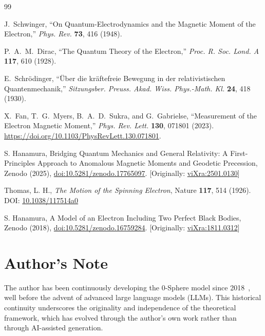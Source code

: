 \documentclass[%
 reprint,
 amsmath,amssymb,
 aps,
]{revtex4-1}
\numberwithin{equation}{section}
\begin{document}
\clearpage

\begin{thebibliography}{99}

J.~Schwinger,
``On Quantum-Electrodynamics and the Magnetic Moment of the Electron,''
\textit{Phys. Rev.} \textbf{73}, 416 (1948).

P.~A.~M.~Dirac,
``The Quantum Theory of the Electron,''
\textit{Proc. R. Soc. Lond. A} \textbf{117}, 610 (1928).

E.~Schr\"odinger,
``\"Uber die kr\"aftefreie Bewegung in der relativistischen Quantenmechanik,''
\textit{Sitzungsber. Preuss. Akad. Wiss. Phys.-Math. Kl.} \textbf{24}, 418 (1930).

X.~Fan, T.~G.~Myers, B.~A.~D.~Sukra, and G.~Gabrielse, 
``Measurement of the Electron Magnetic Moment,'' 
\textit{Phys. Rev. Lett.} \textbf{130}, 071801 (2023). 
\href{https://doi.org/10.1103/PhysRevLett.130.071801}{https://doi.org/10.1103/PhysRevLett.130.071801}.

S. Hanamura, Bridging Quantum Mechanics and General Relativity: A First-Principles Approach to Anomalous Magnetic Moments and Geodetic Precession, Zenodo (2025), \href{https://doi.org/10.5281/zenodo.17765097}{doi:10.5281/zenodo.17765097}. [Originally: \href{https://vixra.org/abs/2501.0130}{viXra:2501.0130}]

Thomas, L. H., 
\textit{The Motion of the Spinning Electron}, 
Nature \textbf{117}, 514 (1926). 
DOI: \href{https://doi.org/10.1038/117514a0}{10.1038/117514a0}

S. Hanamura, A Model of an Electron Including Two Perfect Black Bodies, Zenodo (2018), \href{https://doi.org/10.5281/zenodo.16759284}{doi:10.5281/zenodo.16759284}. [Originally: \href{https://vixra.org/abs/1811.0312}{viXra:1811.0312}]

\end{thebibliography}

\section*{Author's Note}
The author has been continuously developing the 0-Sphere model since 2018~\cite{zenodo.16759284}, well before the advent of advanced large language models (LLMs). This historical continuity underscores the originality and independence of the theoretical framework, which has evolved through the author's own work rather than through AI-assisted generation.
\end{document}
